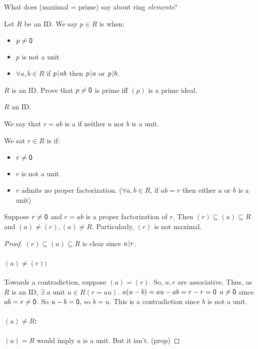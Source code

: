 \documentclass[notes.tex]{subfiles}
\begin{document}
What does (maximal = prime) say about ring \emph{elements}?

\begin{defn}
	Let $R$ be an ID. We say $p\in R$ is  when:
	\begin{itemize}
		\item $p\ne\mathsf{0}$
		\item $p$ is not a unit
		\item $\forall a,b\in R$ if $p\mkern2mu|\mkern1mu ab$ then $p\mkern2mu|\mkern1mu a$ or $p\mkern2mu|\mkern1mu b$.
	\end{itemize}
\end{defn}

\begin{exercise}
	$R$ is an ID. Prove that $p\ne\mathsf{0}$ is prime iff $(p)$ is a prime ideal.
\end{exercise}

$R$ an ID.

\begin{defn}
	We say that $r=ab$ is a  if neither $a$ nor $b$ is a unit.
\end{defn}

\begin{defn}
	We sat $r\in R$ is  if:
	\begin{itemize}
		\item $r\ne\mathsf{0}$
		\item $r$ is not a unit
		\item $r$ admits no proper factorization.
		($\forall a,b\in R$, if $ab = r$ then either $a$ or $b$ is a unit)
	\end{itemize}
\end{defn}

\begin{proposition}
	Suppose $r\ne\mathsf{0}$ and $r=ab$ is a proper factorization of $r$. Then $(r)\subseteq (a)\subseteq R$ and $(a) \ne (r), (a)\ne R$.
	Particularly, $(r)$ is not maximal.
\end{proposition}
\begin{proof}
	$(r)\subseteq (a)\subseteq R$ is clear since $a\mkern2mu|\mkern1mu r$.

	\paragraph{$(a)\ne (r)$:} Towards a contradiction, suppose $(a) = (r)$. So, $a,r$ are associative. Thus, as $R$ is an ID, $\exists \text{ a unit } u\in R (r=au)$.
	$a(u-b) = au-ab = r-r=\mathsf{0}$
	$a\ne \mathsf{0}$ since $ab = r \ne \mathsf{0}$. So $u-b = \mathsf{0},$ so $b=u$. This is a contradiction since $b$ is not a unit.

	\paragraph{$(a)\ne R$:} $(a) = R$ would imply $a$ is a unit. But it isn't.
	\qedhere(prop)
\end{proof}
\end{document}
